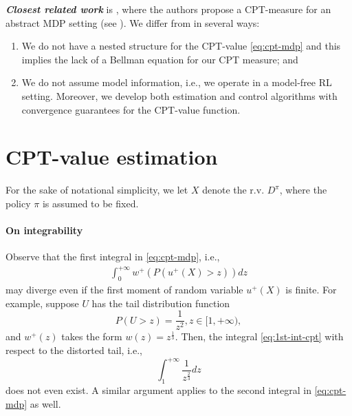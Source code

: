 \documentclass[11pt,letterpaper,english]{article}
\begin{document}
\noindent
\textit{\textbf{Closest related work}} is \cite{lin2013stochastic}, where the authors propose a CPT-measure for an abstract MDP setting (see \cite{bertsekas2013abstract}). We differ from \cite{lin2013stochastic} in several ways:
\begin{enumerate}[\bfseries (i)]
\item We do not have a nested structure for the CPT-value \eqref{eq:cpt-mdp} and this implies the lack of a Bellman equation for our CPT measure; and
\item We do not assume model information, i.e., we operate in a model-free RL setting. Moreover, we develop both estimation and control algorithms with convergence guarantees for the CPT-value function.
\end{enumerate}




\section{CPT-value estimation} 
\label{sec:cpt-sampling}

For the sake of notational simplicity, we let $X$ denote the r.v. $D^\pi$, where the policy $\pi$ is assumed to be fixed. 

\paragraph{On integrability}
Observe that the first integral in \eqref{eq:cpt-mdp}, i.e., 
\begin{align}
\label{eq:1st-int-cpt}
\int_0^{+\infty} w^+(P(u^+(X)>z)) d z
\end{align}
may diverge even if the first moment of random variable $u^+(X)$ is finite. 
For example, suppose $U$ has the tail distribution function
$$P(U>z)  = \frac{1}{z^2}, z\in [1, +\infty),$$
and $w^+(z)$ takes the form $w(z) = z^{\frac{1}{3}}$. Then, the integral \eqref{eq:1st-int-cpt} with respect to the distorted tail, i.e.,
$$
\int_1^{+\infty} \frac{1}{z^{\frac{2}{3}}} dz
$$
does not even exist. A similar argument applies to the second integral in \eqref{eq:cpt-mdp} as well.
\end{document}

